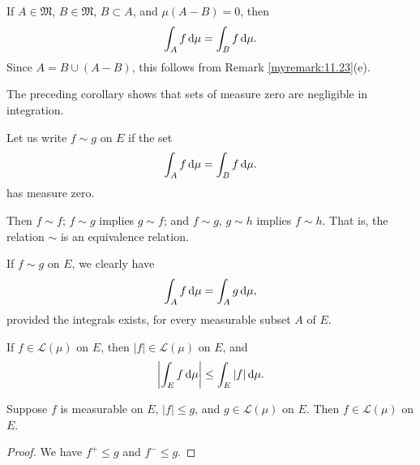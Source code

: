 \begin{myCorollary*}
    If $A \in \mathfrak{M}$, $B \in \mathfrak{M}$, $B \subset A$, and $\mu(A-B)=0$, then
    \begin{equation*}
        \int_A f \d \mu = 
        \int_B f \d \mu .
    \end{equation*}
    Since $A =B\cup (A - B)$, this follows from Remark \ref{myremark:11.23}(e).
\end{myCorollary*}

\begin{myremark}
    \label{myremark:11.25}
    The preceding corollary shows that sets of measure zero are negligible in integration. 

    Let us write $f \sim g$ on $E$ if the set
    \begin{equation*}
        \int_A f \d \mu =
        \int_B f \d \mu .
    \end{equation*}
    has measure zero.

    Then $f \sim f$; $f \sim g$ implies $g \sim f$; 
    and  $f \sim g$, $g \sim h$ implies $f \sim h$.
    That is, the relation $\sim$ is an equivalence relation.

    If $f \sim g$ on $E$, we clearly have 
    \begin{equation*}
        \int_A f \d \mu =
        \int_A g \d \mu ,
    \end{equation*}
    provided the integrals exists, for every measurable subset $A$ of $E$.
\end{myremark}

\begin{thm}
    \label{thm:11.26}
    If $f \in \mathscr{L}(\mu)$ on $E$, then $\left| f \right| \in \mathscr{L}(\mu)$ on $E$, and 
    \begin{equation}
        \label{eq:11.63}
        \left| \int_E f \d \mu \right| \leq
        \int_E \left| f \right| \d \mu .
    \end{equation}
\end{thm}

\begin{thm}
    \label{thm:11.27}
    Suppose $f$ is measurable on $E$, $\left| f \right| \leq g$, and $g \in \mathscr{L}(\mu)$ on $E$. 
    Then $f \in \mathscr{L}(\mu)$ on $E$.
\end{thm}

\begin{proof}
    We have $f^+ \leq g$ and $f^- \leq g$.
\end{proof}

